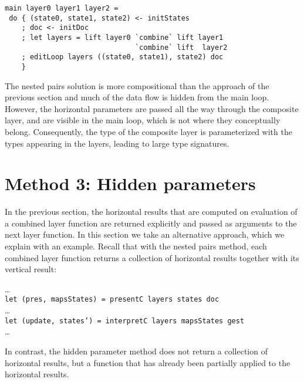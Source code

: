 \documentclass[preprint,natbib]{sigplanconf}
\begin{document}
\begin{small}
\begin{verbatim}
main layer0 layer1 layer2 = 
 do { (state0, state1, state2) <- initStates
    ; doc <- initDoc 
    ; let layers = lift layer0 `combine` lift layer1 
                               `combine` lift  layer2
    ; editLoop layers ((state0, state1), state2) doc
    }
\end{verbatim}
\end{small}



The nested pairs solution is more compositional than the approach of the previous section and much of the data flow is hidden from the main loop. However, the horizontal parameters are passed all the way through the composite layer, and are visible in the main loop, which is not where they conceptually belong. Consequently, the type of the composite layer is parameterized with the types appearing in the layers, leading to large type signatures.



%																
%																
%																
\section{Method 3: Hidden parameters} \label{sect:hidden}

 
In the previous section, the horizontal results that are computed on evaluation of a combined layer function are returned explicitly and passed as arguments to the next layer function. In this section we take an alternative approach, which we explain with an example.  Recall that with the nested pairs method, each combined layer function returns a collection of horizontal results together with its vertical result:

\dots\\
{\tt  let (pres, mapsStates) = presentC layers states doc }\\
\dots\\
{\tt let (update, states') = interpretC layers mapsStates gest}\\
\dots

In contrast, the hidden parameter method does not return a collection of horizontal results, but a function that has already been partially applied to the horizontal results.
\end{document}
